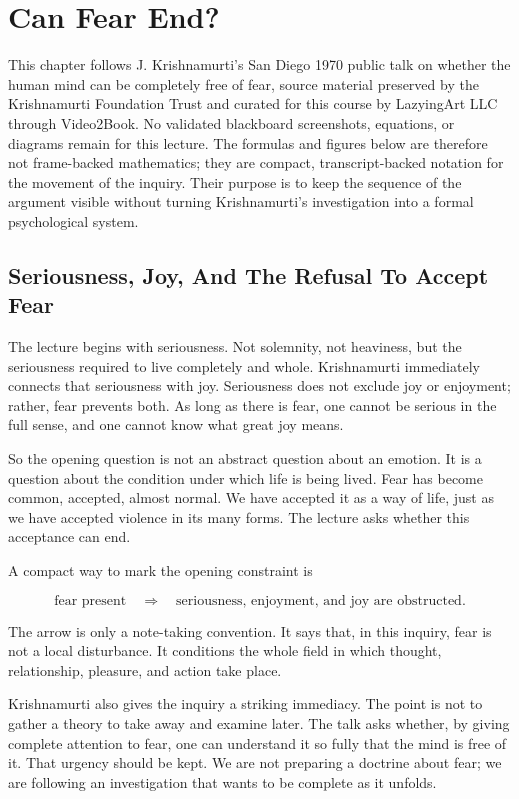 \chapter{Can Fear End?}

This chapter follows J. Krishnamurti's San Diego 1970 public talk on whether the human mind can be completely free of fear, source material preserved by the Krishnamurti Foundation Trust and curated for this course by LazyingArt LLC through Video2Book. No validated blackboard screenshots, equations, or diagrams remain for this lecture. The formulas and figures below are therefore not frame-backed mathematics; they are compact, transcript-backed notation for the movement of the inquiry. Their purpose is to keep the sequence of the argument visible without turning Krishnamurti's investigation into a formal psychological system.

\section{Seriousness, Joy, And The Refusal To Accept Fear}

The lecture begins with seriousness. Not solemnity, not heaviness, but the seriousness required to live completely and whole. Krishnamurti immediately connects that seriousness with joy. Seriousness does not exclude joy or enjoyment; rather, fear prevents both. As long as there is fear, one cannot be serious in the full sense, and one cannot know what great joy means.

So the opening question is not an abstract question about an emotion. It is a question about the condition under which life is being lived. Fear has become common, accepted, almost normal. We have accepted it as a way of life, just as we have accepted violence in its many forms. The lecture asks whether this acceptance can end.

A compact way to mark the opening constraint is

\begin{equation}
\text{fear present}
\quad \Longrightarrow \quad
\text{seriousness, enjoyment, and joy are obstructed}.
\end{equation}

The arrow is only a note-taking convention. It says that, in this inquiry, fear is not a local disturbance. It conditions the whole field in which thought, relationship, pleasure, and action take place.

Krishnamurti also gives the inquiry a striking immediacy. The point is not to gather a theory to take away and examine later. The talk asks whether, by giving complete attention to fear, one can understand it so fully that the mind is free of it. That urgency should be kept. We are not preparing a doctrine about fear; we are following an investigation that wants to be complete as it unfolds.

